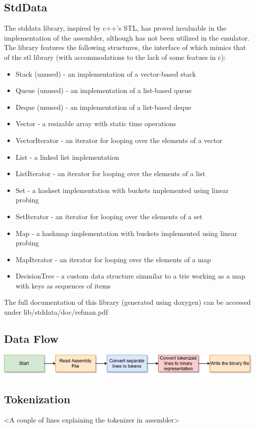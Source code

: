 \documentclass[11pt]{article}
\begin{document}
\subsection*{StdData}
The stddata library, inspired by c++'s STL, has proved invaluable in the implementation of the assembler, although has not been utilized in the emulator. The library features the following structures, the interface of which mimics that of the stl library (with accommodations to the lack of some featues in c):
\begin{itemize}
\item Stack (unused) - an implementation of a vector-based stack
\item Queue (unused) - an implementation of a list-based queue
\item Deque (unused) - an implementation of a list-based deque
\item Vector - a resizable array with static time operations
\item VectorIterator - an iterator for looping over the elements of a vector
\item List - a linked list implementation
\item ListIterator - an iterator for looping over the elements of a list
\item Set - a hashset implementation with buckets implemented using linear probing
\item SetIterator - an iterator for looping over the elements of a set
\item Map - a hashmap implementation with buckets implemented using linear probing
\item MapIterator - an iterator for looping over the elements of a map
\item DecisionTree - a custom data structure simmilar to a trie working as a map with keys as sequences of items
\end{itemize}
The full documentation of this library (generated using doxygen) can be accessed under lib/stddata/doc/refman.pdf
\subsection*{Data Flow}
\includegraphics[scale=0.6]{assembler_dataflow}
\subsection*{Tokenization}
<A couple of lines explaining the tokenizer in assembler>
\end{document}
